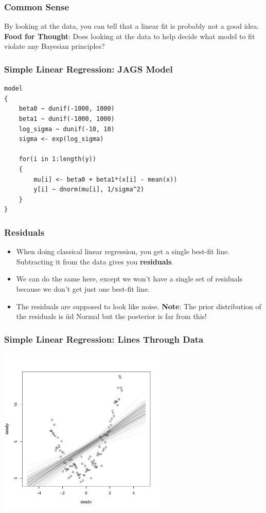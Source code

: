 \documentclass{beamer}
\begin{document}
\begin{frame}
\frametitle{Common Sense}
By looking at the data, you can tell that a linear fit is probably not a good
idea. {\bf Food for Thought}: Does looking at the data to help decide what
model to fit violate any Bayesian principles?


\end{frame}


\begin{frame}[fragile]
\frametitle{Simple Linear Regression: JAGS Model}
\footnotesize
\begin{verbatim}
model
{
    beta0 ~ dunif(-1000, 1000)
    beta1 ~ dunif(-1000, 1000)
    log_sigma ~ dunif(-10, 10)
    sigma <- exp(log_sigma)

    for(i in 1:length(y))
    {
        mu[i] <- beta0 + beta1*(x[i] - mean(x))
        y[i] ~ dnorm(mu[i], 1/sigma^2)
    }
}
\end{verbatim}

\end{frame}



\begin{frame}[fragile]
\frametitle{Residuals}

\begin{itemize}
\item When doing classical linear regression, you get a single best-fit line.
Subtracting it from the data gives you {\bf residuals}.\pause
\item We can do the same here, except we won't have a single set of residuals
because we don't get just one best-fit line.\pause
\item The residuals are supposed to look like noise. {\bf Note}: The prior
distribution of the residuals is iid Normal but the posterior is far from this!
\end{itemize}

\end{frame}

\begin{frame}
\frametitle{Simple Linear Regression: Lines Through Data}

\begin{center}
\includegraphics[width=0.6\textwidth]{images/quadratic_fit.pdf}
\end{center}

\end{frame}
\end{document}
